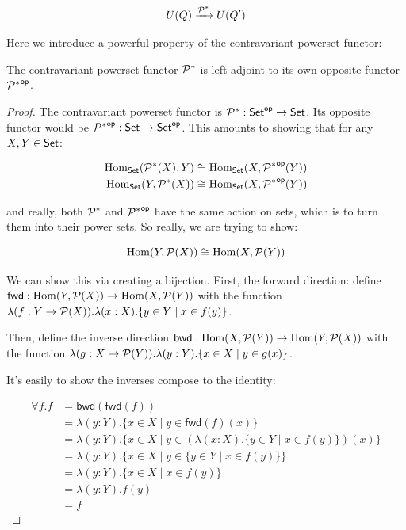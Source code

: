\begin{equation}
    U(Q) \xrightarrow{\mathcal P^*} U(Q')
\end{equation}

Here we introduce a powerful property of the contravariant powerset functor:

\begin{lemma}
    \label{lem:contrPowerSetSelfDual}
    The contravariant powerset functor $\mathcal P^*$ is left adjoint to its own opposite functor ${\mathcal P^*}^{\mathsf{op}}$.
\end{lemma}

\begin{proof}
  The contravariant powerset functor is $\mathcal P^* : \mathsf{Set}^{\mathsf{op}} \rightarrow \mathsf{Set}$.
  Its opposite functor would be ${\mathcal P^*}^{\mathsf{op}} : \mathsf{Set} \rightarrow \mathsf{Set}^{\mathsf{op}}$.
  This amounts to showing that for any $X, Y \in \mathsf{Set}$:

  \begin{align}
    \operatorname{Hom}_{\mathsf{Set}} (\mathcal P^* (X), Y) &\cong \operatorname{Hom}_{\mathsf{Set}} (X, {\mathcal P^*}^{\mathsf{op}}(Y)) \\
    \operatorname{Hom}_{\mathsf{Set}} (Y, \mathcal P^*(X)) &\cong \operatorname{Hom}_{\mathsf{Set}} (X, {\mathcal P^*}^{\mathsf{op}}(Y))
  \end{align}

  and really, both $\mathcal P^*$ and ${\mathcal P^*}^{\mathsf{op}}$ have the same action on sets, which is to turn them into their power sets. So really, we are trying to show:

  \begin{equation}
    \operatorname{Hom}(Y, \mathcal P(X)) \cong \operatorname{Hom}(X, \mathcal P(Y))
  \end{equation}

  \newcommand{\fwd}{\mathsf{fwd}}
  \newcommand{\bwd}{\mathsf{bwd}}
  We can show this via creating a bijection.
  First, the forward direction: define $\fwd : \Hom(Y, \calP(X)) \rightarrow \Hom(X, \calP(Y))$ with the function $\lambda (f : Y \rightarrow \mathcal P(X)) . \lambda (x : X) . \{y \in Y \mid x \in f(y)\}$.
  
  Then, define the inverse direction $\bwd : \Hom(X, \calP(Y)) \rightarrow \Hom(Y, \calP(X))$ with the function $\lambda (g : X \rightarrow \mathcal P(Y)) . \lambda (y : Y) . \{x \in X \mid y \in g(x)\}$.

  It's easily to show the inverses compose to the identity:

\begin{align*}
  \forall f . f & = \bwd(\fwd(f)) \\
  & = \lambda (y : Y) . \{x \in X \mid y \in \fwd(f)(x) \} \\
  & = \lambda (y : Y) . \{x \in X \mid y \in (\lambda (x : X) . \{ y \in Y \mid x \in f(y)\})(x) \} \\
  & = \lambda (y : Y) . \{x \in X \mid y \in \{ y \in Y \mid x \in f(y) \} \} \\
  & = \lambda (y : Y) . \{x \in X \mid x \in f(y) \} \\
  & = \lambda (y : Y) . f(y) \\
  & = f \
\end{align*}


\end{proof}
